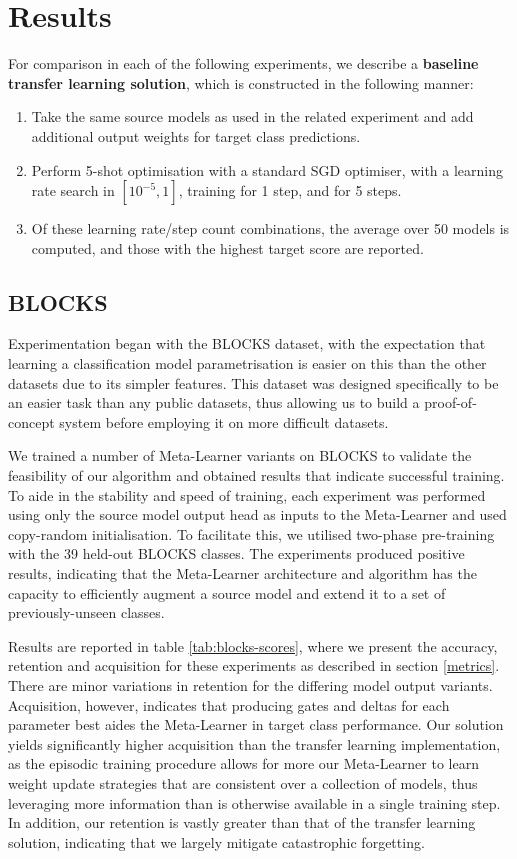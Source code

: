 \documentclass{report}
\begin{document}
\chapter{Results} \label{results-chapter}
For comparison in each of the following experiments, we describe a \textbf{baseline transfer learning solution}, which is constructed in the following manner:
\begin{enumerate}
	\item Take the same source models as used in the related experiment and add additional output weights for target class predictions.
	\item Perform 5-shot optimisation with a standard SGD optimiser, with a learning rate search in $[10^{-5}, 1]$, training for 1 step, and for 5 steps.
	\item Of these learning rate/step count combinations, the average over 50 models is computed, and those with the highest target score are reported.
\end{enumerate}

\section{BLOCKS}
Experimentation began with the BLOCKS dataset, with the expectation that learning a classification model parametrisation is easier on this than the other datasets due to its simpler features. This dataset was designed specifically to be an easier task than any public datasets, thus allowing us to build a proof-of-concept system before employing it on more difficult datasets. \par
We trained a number of Meta-Learner variants on BLOCKS to validate the feasibility of our algorithm and obtained results that indicate successful training. To aide in the stability and speed of training, each experiment was performed using only the source model output head as inputs to the Meta-Learner and used copy-random initialisation. To facilitate this, we utilised two-phase pre-training with the 39 held-out BLOCKS classes. The experiments produced positive results, indicating that the Meta-Learner architecture and algorithm has the capacity to efficiently augment a source model and extend it to a set of previously-unseen classes. \par
Results are reported in table \ref{tab:blocks-scores}, where we present the accuracy, retention and acquisition for these experiments as described in section \ref{metrics}. 
There are minor variations in retention for the differing model output variants. Acquisition, however, indicates that producing gates and deltas for each parameter best aides the Meta-Learner in target class performance. Our solution yields significantly higher acquisition than the transfer learning implementation, as the episodic training procedure allows for more our Meta-Learner to learn weight update strategies that are consistent over a collection of models, thus leveraging more information than is otherwise available in a single training step. In addition, our retention is vastly greater than that of the transfer learning solution, indicating that we largely mitigate catastrophic forgetting. \par
\end{document}
